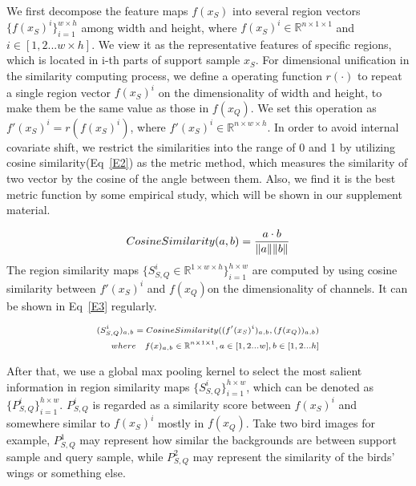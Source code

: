 \documentclass[letterpaper]{article}
\begin{document}
We first decompose the feature maps $f(x_{S})$ into several region vectors $\{f(x_{S})^{i}\}_{i=1}^{w\times h}$ among width and height, where $f(x_{S})^{i} \in \mathbb{R}^{n\times 1\times 1}$ and $i\in[1,2...w\times h]$. We view it as the representative features of specific regions, which is located in i-th parts of support sample $x_{S}$. For dimensional unification in the similarity computing process, we define a operating function $r(\cdot)$ to repeat a single region vector $f(x_{S})^{i}$ on the dimensionality of width and height, to make them be the same value as those in $f(x_{Q})$. We set this operation as $f'(x_{S})^{i} = r(f(x_S)^{i})$, where $f'(x_{S})^{i} \in \mathbb{R}^{n\times w\times h}$. In order to avoid internal covariate shift, we restrict the similarities into the range of 0 and 1 by utilizing cosine similarity(Eq~\ref{E2}) as the metric method, which measures the similarity of two vector by the cosine of the angle between them. Also, we find it is the best metric function by some empirical study, which will be shown in our supplement material.

\begin{equation}\scriptsize
    CosineSimilarity(a,b) = \dfrac{a\cdot b}{\|a\|\|b\|} \label{E2}
\end{equation}
The region similarity maps $\{S_{S,Q}^{i}\in \mathbb{R}^{1\times w \times h}\}_{i=1}^{h\times w}$ are computed by using cosine similarity between $f'(x_{S})^{i}$ and $f(x_{Q})$on the dimensionality of channels. It can be shown in Eq~\ref{E3} regularly.

\begin{equation}\scriptsize
\begin{aligned}
(S_{S,Q}^{i})_{a,b} = CosineSimilarity((f'(x_{S})^{i})_{a,b},(f(x_{Q}))_{a,b})\\
where\quad f(x)_{a,b}\in \mathbb{R}^{n\times1\times1}, a\in [1,2...w], b\in [1,2...h] \label{E3}
\end{aligned}
\end{equation}

After that, we use a global max pooling kernel to select the most salient information in region similarity maps $\{S_{S,Q}^{i}\}_{i=1}^{h\times w}$, which can be denoted as $\{P_{S,Q}^{i}\}_{i=1}^{h\times w}$. $P_{S,Q}^{i}$ is regarded as a similarity score between $f(x_{S})^{i}$ and somewhere similar to $f(x_{S})^{i}$ mostly in $f(x_{Q})$. Take two bird images for example, $P_{S,Q}^{1}$ may represent how similar the backgrounds are between support sample and query sample, while $P_{S,Q}^{2}$ may represent the similarity of the birds' wings or something else. 
\end{document}
